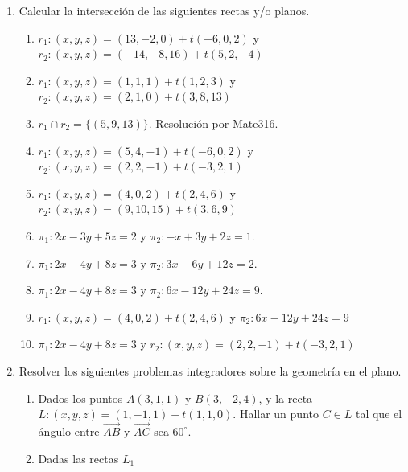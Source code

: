 \documentclass[a4paper]{article}
\newcommand{\answer}{\item[**]}
\newcommand{\exercise}{\item}
\begin{document}
\begin{enumerate}
	\exercise Calcular la intersección de las siguientes rectas y/o planos.
	\begin{enumerate} [label=(\alph*)]

		\item $r_1: (x,y,z)=(13,-2,0)+t(-6,0,2)$ y $r_2: (x,y,z)=(-14,-8,16)+t(5,2,-4)$

		\item $r_1: (x,y,z)=(1,1,1)+t(1,2,3)$ y $r_2: (x,y,z)=(2,1,0)+t(3,8,13)$
		\answer $r_1 \cap r_2 = \{(5,9,13)\}$. Resolución por \href{https://youtu.be/KebOzsUUmq4?t=2304}{Mate316}.

		\item $r_1: (x,y,z)=(5,4,-1)+t(-6,0,2)$ y $r_2: (x,y,z)=(2,2,-1)+t(-3,2,1)$
		\item $r_1: (x,y,z)=(4,0,2)+t(2,4,6)$ y $r_2: (x,y,z)=(9,10,15)+t(3,6,9)$
		\item $\pi_1: 2x-3y+5z=2$ y $\pi_2: -x+3y+2z=1$.
		\item $\pi_1: 2x-4y+8z=3$ y $\pi_2: 3x-6y+12z=2$.
		\item $\pi_1: 2x-4y+8z=3$ y $\pi_2: 6x-12y+24z=9$.
		\item $r_1: (x,y,z)=(4,0,2)+t(2,4,6)$ y $\pi_2: 6x-12y+24z=9$
		\item $\pi_1: 2x-4y+8z=3$ y $r_2: (x,y,z)=(2,2,-1)+t(-3,2,1)$

	\end{enumerate}

	\exercise Resolver los siguientes problemas integradores sobre la geometría en el plano.
	\begin{enumerate} [label=(\alph*)]
		
		\item Dados los puntos $A(3,1,1)$ y $B(3,-2,4)$, y la recta $L: (x,y,z)=(1,-1,1)+t(1,1,0)$. Hallar un punto $C\in L$ tal que el ángulo entre $\overrightarrow{AB}$ y $\overrightarrow{AC}$ sea $60^{\circ}$.
		
		\item Dadas las rectas $L_1$

	\end{enumerate}

\end{enumerate}
\end{document}

